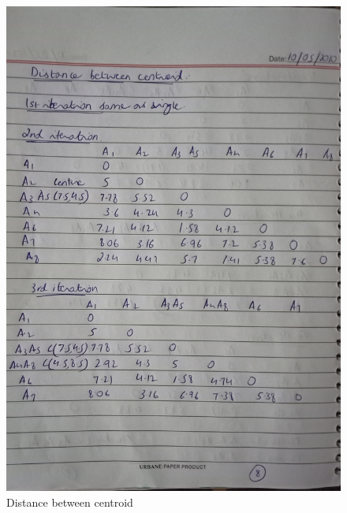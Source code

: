 \documentclass[12pt]{article}
\begin{document}
\begin{figure}
  \includegraphics[width=\linewidth]{8.jpg}
  \caption{Distance between centroid}
  \label{pic8}
\end{figure}
\end{document}
